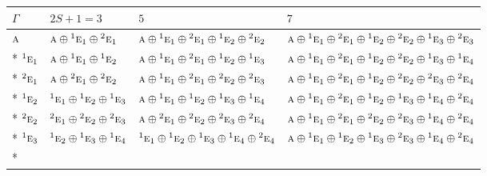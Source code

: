 \documentclass[10pt,a4paper]{article}
\numberwithin{equation}{section}
\newcommand{\irr}[1]{\text{\normalfont\scshape #1}}
\newcommand{\conjpair}[1]{{}^{#1}}
\begin{document}
{\small\setlength{\tabcolsep}{3pt}\begin{longtable}{@{}llll@{}}\toprule
$\Gamma$ & $2S + 1 = 3$ & $5$ & $7$\\\midrule\endhead
\bottomrule\endfoot\endlastfoot
$\irr{a}$ & $\irr{a}\oplus \conjpair{1}\irr{e}_{1}\oplus \conjpair{2}\irr{e}_{1}$ & $\irr{a}\oplus \conjpair{1}\irr{e}_{1}\oplus \conjpair{2}\irr{e}_{1}\oplus \conjpair{1}\irr{e}_{2}\oplus \conjpair{2}\irr{e}_{2}$ & $\irr{a}\oplus \conjpair{1}\irr{e}_{1}\oplus \conjpair{2}\irr{e}_{1}\oplus \conjpair{1}\irr{e}_{2}\oplus \conjpair{2}\irr{e}_{2}\oplus \conjpair{1}\irr{e}_{3}\oplus \conjpair{2}\irr{e}_{3}$\\*
$\conjpair{1}\irr{e}_{1}$ & $\irr{a}\oplus \conjpair{1}\irr{e}_{1}\oplus \conjpair{1}\irr{e}_{2}$ & $\irr{a}\oplus \conjpair{1}\irr{e}_{1}\oplus \conjpair{2}\irr{e}_{1}\oplus \conjpair{1}\irr{e}_{2}\oplus \conjpair{1}\irr{e}_{3}$ & $\irr{a}\oplus \conjpair{1}\irr{e}_{1}\oplus \conjpair{2}\irr{e}_{1}\oplus \conjpair{1}\irr{e}_{2}\oplus \conjpair{2}\irr{e}_{2}\oplus \conjpair{1}\irr{e}_{3}\oplus \conjpair{1}\irr{e}_{4}$\\*
$\conjpair{2}\irr{e}_{1}$ & $\irr{a}\oplus \conjpair{2}\irr{e}_{1}\oplus \conjpair{2}\irr{e}_{2}$ & $\irr{a}\oplus \conjpair{1}\irr{e}_{1}\oplus \conjpair{2}\irr{e}_{1}\oplus \conjpair{2}\irr{e}_{2}\oplus \conjpair{2}\irr{e}_{3}$ & $\irr{a}\oplus \conjpair{1}\irr{e}_{1}\oplus \conjpair{2}\irr{e}_{1}\oplus \conjpair{1}\irr{e}_{2}\oplus \conjpair{2}\irr{e}_{2}\oplus \conjpair{2}\irr{e}_{3}\oplus \conjpair{2}\irr{e}_{4}$\\*
$\conjpair{1}\irr{e}_{2}$ & $\conjpair{1}\irr{e}_{1}\oplus \conjpair{1}\irr{e}_{2}\oplus \conjpair{1}\irr{e}_{3}$ & $\irr{a}\oplus \conjpair{1}\irr{e}_{1}\oplus \conjpair{1}\irr{e}_{2}\oplus \conjpair{1}\irr{e}_{3}\oplus \conjpair{1}\irr{e}_{4}$ & $\irr{a}\oplus \conjpair{1}\irr{e}_{1}\oplus \conjpair{2}\irr{e}_{1}\oplus \conjpair{1}\irr{e}_{2}\oplus \conjpair{1}\irr{e}_{3}\oplus \conjpair{1}\irr{e}_{4}\oplus \conjpair{2}\irr{e}_{4}$\\*
$\conjpair{2}\irr{e}_{2}$ & $\conjpair{2}\irr{e}_{1}\oplus \conjpair{2}\irr{e}_{2}\oplus \conjpair{2}\irr{e}_{3}$ & $\irr{a}\oplus \conjpair{2}\irr{e}_{1}\oplus \conjpair{2}\irr{e}_{2}\oplus \conjpair{2}\irr{e}_{3}\oplus \conjpair{2}\irr{e}_{4}$ & $\irr{a}\oplus \conjpair{1}\irr{e}_{1}\oplus \conjpair{2}\irr{e}_{1}\oplus \conjpair{2}\irr{e}_{2}\oplus \conjpair{2}\irr{e}_{3}\oplus \conjpair{1}\irr{e}_{4}\oplus \conjpair{2}\irr{e}_{4}$\\*
$\conjpair{1}\irr{e}_{3}$ & $\conjpair{1}\irr{e}_{2}\oplus \conjpair{1}\irr{e}_{3}\oplus \conjpair{1}\irr{e}_{4}$ & $\conjpair{1}\irr{e}_{1}\oplus \conjpair{1}\irr{e}_{2}\oplus \conjpair{1}\irr{e}_{3}\oplus \conjpair{1}\irr{e}_{4}\oplus \conjpair{2}\irr{e}_{4}$ & $\irr{a}\oplus \conjpair{1}\irr{e}_{1}\oplus \conjpair{1}\irr{e}_{2}\oplus \conjpair{1}\irr{e}_{3}\oplus \conjpair{2}\irr{e}_{3}\oplus \conjpair{1}\irr{e}_{4}\oplus \conjpair{2}\irr{e}_{4}$\\*

\end{longtable}}
\end{document}
